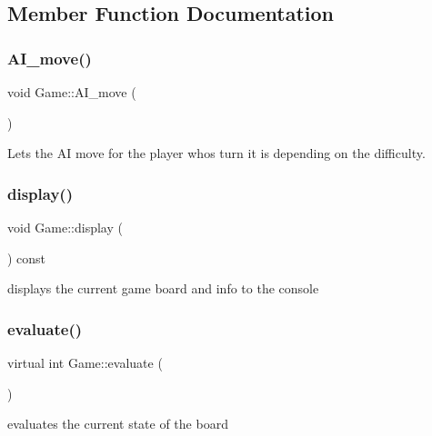 \subsection{Member Function Documentation}
\mbox{\label{class_game_ac495c211545773a11948a3b3ac52bb18}} 
\subsubsection{\texorpdfstring{A\+I\+\_\+move()}{AI\_move()}}
{\footnotesize\ttfamily void Game\+::\+A\+I\+\_\+move (\begin{DoxyParamCaption}{ }\end{DoxyParamCaption})}



Lets the AI move for the player whos turn it is depending on the difficulty. 

\mbox{\label{class_game_ae98bb6563800f3265d7da2445804ea97}} 
\subsubsection{\texorpdfstring{display()}{display()}}
{\footnotesize\ttfamily void Game\+::display (\begin{DoxyParamCaption}{ }\end{DoxyParamCaption}) const}



displays the current game board and info to the console 

\mbox{\label{class_game_a068b2b3012154457f362c90a80f46253}} 
\subsubsection{\texorpdfstring{evaluate()}{evaluate()}}
{\footnotesize\ttfamily virtual int Game\+::evaluate (\begin{DoxyParamCaption}{ }\end{DoxyParamCaption})\hspace{0.3cm}{\ttfamily [pure virtual]}}



evaluates the current state of the board 

